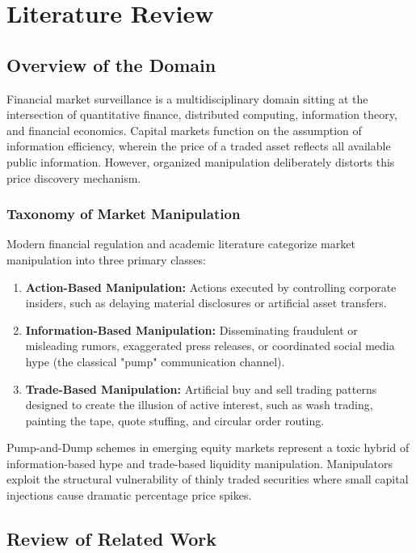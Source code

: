 \chapter{Literature Review}

\section{Overview of the Domain}
Financial market surveillance is a multidisciplinary domain sitting at the intersection of quantitative finance, distributed computing, information theory, and financial economics. Capital markets function on the assumption of information efficiency, wherein the price of a traded asset reflects all available public information. However, organized manipulation deliberately distorts this price discovery mechanism.

\subsection{Taxonomy of Market Manipulation}
Modern financial regulation and academic literature categorize market manipulation into three primary classes:
\begin{enumerate}
    \item \textbf{Action-Based Manipulation:} Actions executed by controlling corporate insiders, such as delaying material disclosures or artificial asset transfers.
    \item \textbf{Information-Based Manipulation:} Disseminating fraudulent or misleading rumors, exaggerated press releases, or coordinated social media hype (the classical "pump" communication channel).
    \item \textbf{Trade-Based Manipulation:} Artificial buy and sell trading patterns designed to create the illusion of active interest, such as wash trading, painting the tape, quote stuffing, and circular order routing.
\end{enumerate}

Pump-and-Dump schemes in emerging equity markets represent a toxic hybrid of information-based hype and trade-based liquidity manipulation. Manipulators exploit the structural vulnerability of thinly traded securities where small capital injections cause dramatic percentage price spikes.

\section{Review of Related Work}

